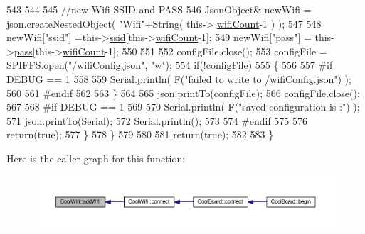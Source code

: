 \begin{DoxyCode}
543             
544             
545             \textcolor{comment}{//new Wifi SSID and PASS}
546             JsonObject& newWifi = json.createNestedObject( \textcolor{stringliteral}{"Wifi"}+String( this->
      \hyperlink{classCoolWifi_ab133bd92fcb895b884deecd6678592e4}{wifiCount}-1 ) );
547             
548             newWifi[\textcolor{stringliteral}{"ssid"}] =this->\hyperlink{classCoolWifi_a893b21d0fed821438733bba2e73fb4c2}{ssid}[this->\hyperlink{classCoolWifi_ab133bd92fcb895b884deecd6678592e4}{wifiCount}-1];
549             newWifi[\textcolor{stringliteral}{"pass"}] = this->\hyperlink{classCoolWifi_a0c3332a149245aaad060b32593a54c9b}{pass}[this->\hyperlink{classCoolWifi_ab133bd92fcb895b884deecd6678592e4}{wifiCount}-1];
550             
551 
552             configFile.close();
553             configFile = SPIFFS.open(\textcolor{stringliteral}{"/wifiConfig.json"}, \textcolor{stringliteral}{"w"});
554             \textcolor{keywordflow}{if}(!configFile)
555             \{
556             
557 \textcolor{preprocessor}{            #if DEBUG == 1 }
558 
559                 Serial.println( F(\textcolor{stringliteral}{"failed to write to /wifiConfig.json"}) );
560             
561 \textcolor{preprocessor}{            #endif}
562 
563             \}
564             
565             json.printTo(configFile);
566             configFile.close();
567 
568 \textcolor{preprocessor}{        #if DEBUG == 1 }
569 
570             Serial.println( F(\textcolor{stringliteral}{"saved configuration is :"}) );
571             json.printTo(Serial);
572             Serial.println();
573         
574 \textcolor{preprocessor}{        #endif}
575 
576             \textcolor{keywordflow}{return}(\textcolor{keyword}{true}); 
577         \}
578     \}   
579 
580     
581     \textcolor{keywordflow}{return}(\textcolor{keyword}{true});
582     
583 \}
\end{DoxyCode}
Here is the caller graph for this function\+:\nopagebreak
\begin{figure}[H]
\begin{center}
\leavevmode
\includegraphics[width=350pt]{classCoolWifi_a914d7a1df14dd6b75345fb614c34e9d6_icgraph}
\end{center}
\end{figure}
\mbox{\label{classCoolWifi_a46942fed90e475112cc10b78a32e7aaa}} 
